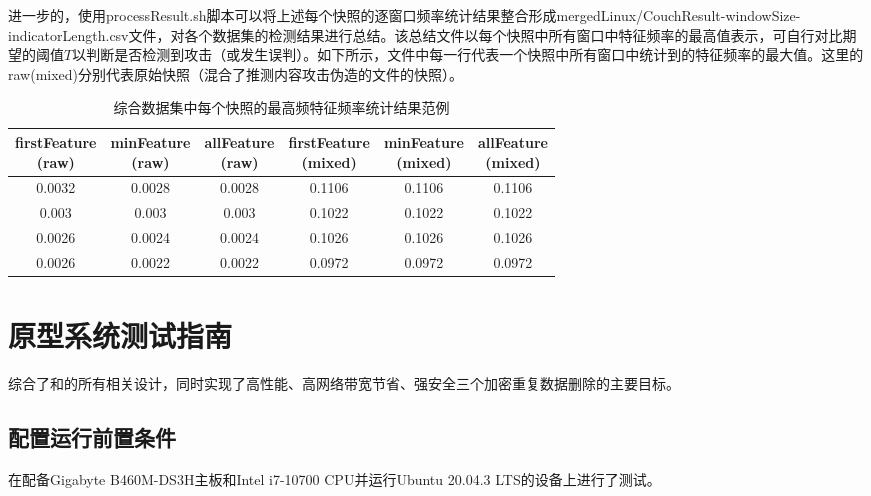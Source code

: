进一步的，使用processResult.sh脚本可以将上述每个快照的逐窗口频率统计结果整合形成merged{Linux/Couch}Result-{windowSize}-{indicatorLength}.csv文件，对各个数据集的检测结果进行总结。该总结文件以每个快照中所有窗口中特征频率的最高值表示，可自行对比期望的阈值$T$以判断是否检测到攻击（或发生误判）。如下所示，文件中每一行代表一个快照中所有窗口中统计到的特征频率的最大值。这里的raw(mixed)分别代表原始快照（混合了推测内容攻击伪造的文件的快照）。

\begin{table}[!htb]
    \small
    \centering
    \begin{tabular}{cccccc}
        \toprule
        \makecell[c]{firstFeature                           \\(raw)} & \makecell[c]{minFeature\\(raw)} & \makecell[c]{allFeature\\(raw)} & \makecell[c]{firstFeature\\(mixed)} & \makecell[c]{minFeature\\(mixed)} & \makecell[c]{allFeature\\(mixed)} \\
        \midrule
        0.0032 & 0.0028 & 0.0028 & 0.1106 & 0.1106 & 0.1106 \\
        0.003  & 0.003  & 0.003  & 0.1022 & 0.1022 & 0.1022 \\
        0.0026 & 0.0024 & 0.0024 & 0.1026 & 0.1026 & 0.1026 \\
        0.0026 & 0.0022 & 0.0022 & 0.0972 & 0.0972 & 0.0972 \\
        \bottomrule
    \end{tabular}
    \caption{综合数据集中每个快照的最高频特征频率统计结果范例}
    \label{tab:system-detection-snapshot}
\end{table}

\section{\prototype 原型系统测试指南}

\prototype 综合了\sysnameS 和\sysnameF 的所有相关设计，同时实现了高性能、高网络带宽节省、强安全三个加密重复数据删除的主要目标。

\subsection*{配置运行前置条件}

\prototype 在配备Gigabyte B460M-DS3H主板和Intel i7-10700 CPU并运行Ubuntu 20.04.3 LTS的设备上进行了测试。

